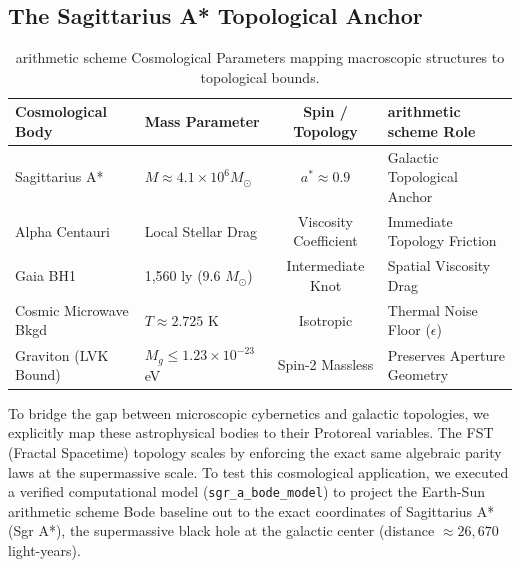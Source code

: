 \subsection{The Sagittarius A* Topological Anchor}

\begin{table}[ht]
\centering
\renewcommand{\arraystretch}{1.2}
\begin{tabular}{llcl}
\hline\hline
\textbf{Cosmological Body} & \textbf{Mass Parameter} & \textbf{Spin / Topology} & \textbf{arithmetic scheme Role} \\
\hline
Sagittarius A* & $M \approx 4.1 \times 10^6 M_\odot$ & $a^* \approx 0.9$ & Galactic Topological Anchor \\
Alpha Centauri & Local Stellar Drag & Viscosity Coefficient & Immediate Topology Friction \\
Gaia BH1 & 1,560 ly (9.6 $M_\odot$) & Intermediate Knot & Spatial Viscosity Drag \\
Cosmic Microwave Bkgd & $T \approx 2.725$ K & Isotropic & Thermal Noise Floor ($\epsilon$) \\
Graviton (LVK Bound) & $M_g \leq 1.23 \times 10^{-23}$ eV & Spin-2 Massless & Preserves Aperture Geometry \\
\hline\hline
\end{tabular}
\caption{arithmetic scheme Cosmological Parameters mapping macroscopic structures to topological bounds.}
\label{tab:cosmo_params}
\end{table}

To bridge the gap between microscopic cybernetics and galactic topologies, we explicitly map these astrophysical bodies to their Protoreal variables. The FST (Fractal Spacetime) topology scales by enforcing the exact same algebraic parity laws at the supermassive scale. 
To test this cosmological application, we executed a verified computational model (\texttt{sgr\_a\_bode\_model}) to project the Earth-Sun arithmetic scheme Bode baseline out to the exact coordinates of Sagittarius A* (Sgr A*), the supermassive black hole at the galactic center (distance $\approx 26,670$ light-years).

